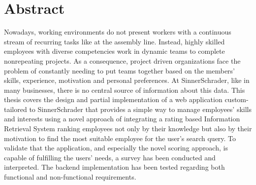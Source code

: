 \chapter{Abstract}
Nowadays, working environments do not present workers with a continuous stream of recurring tasks like at the assembly line. Instead, highly skilled employees with diverse competencies work in dynamic teams to complete nonrepeating projects.
As a consequence, project driven organizations face the problem of constantly needing to put teams together based on the members’ skills, experience, motivation and personal preferences. At SinnerSchrader, like in many businesses, there is no central source of information about this data.
This thesis covers the design and partial implementation of a web application custom-tailored to SinnerSchrader that provides a simple way to manage employees' skills and interests using a novel approach of integrating a rating based Information Retrieval System ranking employees not only by their knowledge but also by their motivation to find the most suitable employee for the user's search query.
To validate that the application, and especially the novel scoring approach, is capable of fulfilling the users’ needs, a survey has been conducted and interpreted. The backend implementation has been tested regarding both functional and non-functional requirements.
